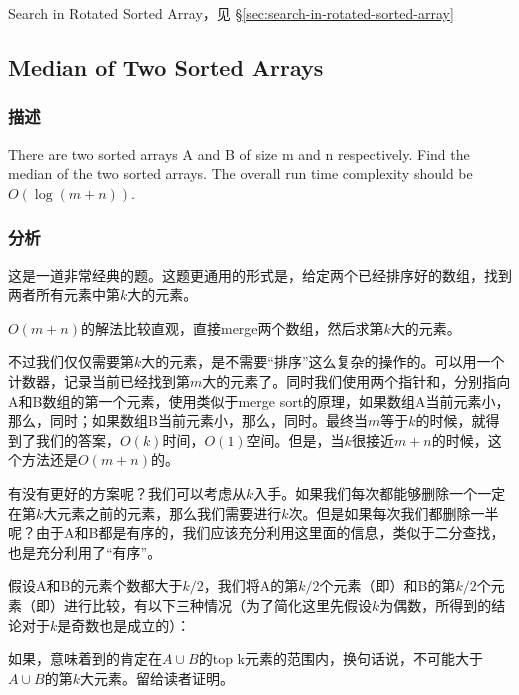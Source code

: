 \begindot
\item Search in Rotated Sorted Array，见 \S \ref{sec:search-in-rotated-sorted-array}
\myenddot


\subsection{Median of Two Sorted Arrays}
\label{sec:median-of-two-sorted-arrays}


\subsubsection{描述}
There are two sorted arrays A and B of size m and n respectively. Find the median of the two sorted arrays. The overall run time complexity should be $O(\log (m+n))$.


\subsubsection{分析}
这是一道非常经典的题。这题更通用的形式是，给定两个已经排序好的数组，找到两者所有元素中第$k$大的元素。

$O(m+n)$的解法比较直观，直接merge两个数组，然后求第$k$大的元素。

不过我们仅仅需要第$k$大的元素，是不需要“排序”这么复杂的操作的。可以用一个计数器，记录当前已经找到第$m$大的元素了。同时我们使用两个指针和，分别指向A和B数组的第一个元素，使用类似于merge sort的原理，如果数组A当前元素小，那么，同时；如果数组B当前元素小，那么，同时。最终当$m$等于$k$的时候，就得到了我们的答案，$O(k)$时间，$O(1)$空间。但是，当$k$很接近$m+n$的时候，这个方法还是$O(m+n)$的。

有没有更好的方案呢？我们可以考虑从$k$入手。如果我们每次都能够删除一个一定在第$k$大元素之前的元素，那么我们需要进行$k$次。但是如果每次我们都删除一半呢？由于A和B都是有序的，我们应该充分利用这里面的信息，类似于二分查找，也是充分利用了“有序”。

假设A和B的元素个数都大于$k/2$，我们将A的第$k/2$个元素（即）和B的第$k/2$个元素（即）进行比较，有以下三种情况（为了简化这里先假设$k$为偶数，所得到的结论对于$k$是奇数也是成立的）：
\begindot
\item {}
\item {}
\item {}
\myenddot

如果，意味着到\fn{A[k/2-1}的肯定在$A \cup B$的top k元素的范围内，换句话说，\fn{A[k/2-1}不可能大于$A \cup B$的第$k$大元素。留给读者证明。

